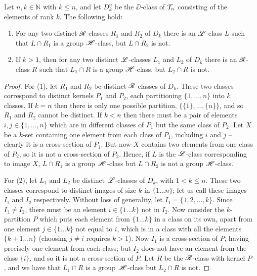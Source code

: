 \begin{lemma}
  \label{lem:dk-hclasses}
  Let $n,k \in \mathbb{N}$ with $k \leq n$, and let $D_k^n$ be the $\DD$-class
  of $\mathcal{T}_n$ consisting of the elements of rank $k$.  The following hold:
  \begin{enumerate}[\rm(1)]
  \item For any two distinct $\mathrel{\mathscr{R}}$-classes $R_1$ and $R_2$ of $D_k$ there is an
    $\mathrel{\mathscr{L}}$-class $L$ such that $L \cap R_1$ is a group $\mathrel{\mathscr{H}}$-class, but
    $L \cap R_2$ is not.
  \item If $k > 1$, then for any two distinct $\mathrel{\mathscr{L}}$-classes $L_1$ and $L_2$ of
    $D_k$ there is an $\mathrel{\mathscr{R}}$-class $R$ such that $L_1 \cap R$ is a group
    $\mathrel{\mathscr{H}}$-class, but $L_2 \cap R$ is not.
  \end{enumerate}
  \begin{proof}
    For (1), let $R_1$ and $R_2$ be distinct $\mathrel{\mathscr{R}}$-classes of $D_k$.  These two
    classes correspond to distinct kernels $P_1$ and $P_2$, each partitioning
    $\{1, \dots, n\}$ into $k$ classes.  If $k=n$ then there is only one
    possible partition, $\big\{\{1\}, \dots, \{n\}\big\}$, and so $R_1$ and
    $R_2$ cannot be distinct.  If $k<n$ then there must be a pair of elements
    $i,j \in \{1,\dots, n\}$ which are in different classes of $P_1$ but the
    same class of $P_2$.  Let $X$ be a $k$-set containing one element from each
    class of $P_1$, including $i$ and $j$ -- clearly it is a cross-section of
    $P_1$.  But now $X$ contains two elements from one class of $P_2$, so it is
    not a cross-section of $P_2$.  Hence, if $L$ is the $\mathrel{\mathscr{L}}$-class
    corresponding to image $X$, $L \cap R_1$ is a group $\mathrel{\mathscr{H}}$-class but
    $L \cap R_2$ is not a group $\mathrel{\mathscr{H}}$-class.

    For (2), let $L_1$ and $L_2$ be distinct $\mathrel{\mathscr{L}}$-classes of $D_k$, with
    $1 < k \leq n$.  These two classes correspond to distinct images of size $k$
    in $\{1 \dots n\}$; let us call these images $I_1$ and $I_2$ respectively.
    Without loss of generality, let $I_1 = \{1, 2, \dots, k\}$.  Since
    $I_1 \neq I_2$, there must be an element $i \in \{1 \dots k\}$ not in $I_2$.
    Now consider the $k$-partition $P$ which puts each element from
    $\{1 \dots k\}$ in a class on its own, apart from one element
    $j \in \{1 \dots k\}$ not equal to $i$, which is in a class with all the
    elements $\{k+1 \dots n\}$ (choosing $j \neq i$ requires $k > 1$).  Now
    $I_1$ is a cross-section of $P$, having precisely one element from each
    class; but $I_2$ does not have an element from the class $\{i\}$, and so it
    is not a cross-section of $P$.  Let $R$ be the $\mathrel{\mathscr{R}}$-class with kernel $P$,
    and we have that $L_1 \cap R$ is a group $\mathrel{\mathscr{H}}$-class but $L_2 \cap R$ is
    not.
  \end{proof}
\end{lemma}

